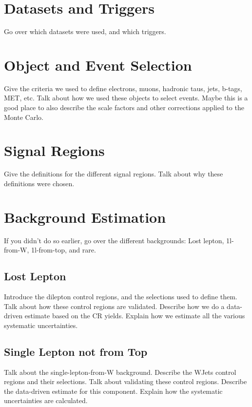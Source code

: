\section{Datasets and Triggers}
\label{sec:stop:datatrig}

Go over which datasets were used, and which triggers.

\section{Object and Event Selection}
\label{sec:stop:selections}

Give the criteria we used to define electrons, muons, hadronic taus,
jets, b-tags, MET, etc.
Talk about how we used these objects to select events.
Maybe this is a good place to also describe the scale factors and
other corrections applied to the Monte Carlo.

\section{Signal Regions}
\label{sec:stop:sigregs}

Give the definitions for the different signal regions.
Talk about why these definitions were chosen.

\section{Background Estimation}
\label{sec:stop:bkgest}

If you didn't do so earlier, go over the different backgrounds:
Lost lepton, 1l-from-W, 1l-from-top, and rare.

\subsection{Lost Lepton}
\label{ssec:stop:lostlep}

Introduce the dilepton control regions, and the selections used
to define them.
Talk about how these control regions are validated.
Describe how we do a data-driven estimate based on the CR yields.
Explain how we estimate all the various systematic uncertainties.

\subsection{Single Lepton not from Top}
\label{ssec:stop:1lw}

Talk about the single-lepton-from-W background.
Describe the WJets control regions and their selections.
Talk about validating these control regions.
Describe the data-driven estimate for this component.
Explain how the systematic uncertainties are calculated.

